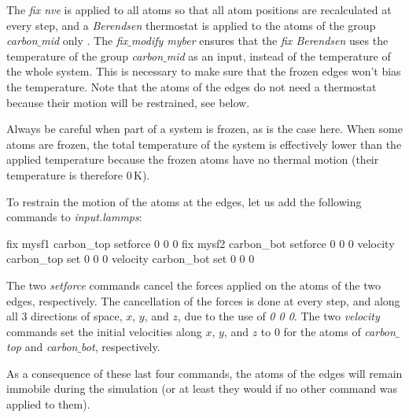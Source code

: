 \vspace{0.25cm} \noindent The \textit{fix nve} is applied to all atoms so that all
atom positions are recalculated at every step, and
a \textit{Berendsen} thermostat is applied to the atoms
of the group \textit{carbon$\_$mid} only \cite{berendsen1984molecular}.
The \textit{fix$\_$modify myber} ensures that the
\textit{fix Berendsen} uses the temperature of the group \textit{carbon$\_$mid} as an
input, instead of the temperature of the whole system. This is necessary
to make sure that the frozen edges won't bias the temperature. Note that the atoms
of the edges do not need a thermostat because their motion will
be restrained, see below.

\begin{tcolorbox}[colback=mylightblue!5!white,colframe=mylightblue!75!black,title=Deal with semi-frozen system]

\vspace{0.25cm} \noindent Always be careful when part of a system is frozen,
as is the case here. When some atoms are frozen, the total temperature
of the system is effectively lower than the applied temperature
because the frozen atoms have no thermal motion (their temperature
is therefore $0\,\text{K}$). 
\end{tcolorbox}

\noindent To restrain the motion of the atoms at the edges, let us add the
following commands to \textit{input.lammps}:

\begin{lcverbatim}
fix mysf1 carbon_top setforce 0 0 0
fix mysf2 carbon_bot setforce 0 0 0
velocity carbon_top set 0 0 0
velocity carbon_bot set 0 0 0
\end{lcverbatim}

\noindent The two \textit{setforce} commands cancel the forces applied on the
atoms of the two edges, respectively. The cancellation of the forces
is done at every step, and along all 3 directions of space, $x$, $y$,
and $z$, due to the use of \textit{0 0 0}. The two \textit{velocity} commands
set the initial velocities along $x$,
$y$, and $z$ to 0 for the atoms of \textit{carbon$\_$top}
and \textit{carbon$\_$bot}, respectively. 

\vspace{0.25cm} \noindent As a consequence of these last four commands, the atoms of the edges will remain
immobile during the simulation (or at least they would if no other command was
applied to them).

